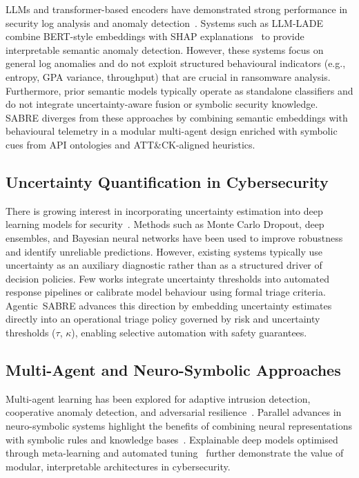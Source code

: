 \documentclass[lettersize,journal]{IEEEtran}
\begin{document}
LLMs and transformer-based encoders have demonstrated strong performance in
security log analysis and anomaly detection~\cite{tian2025llmsurvey, BenchmarkingLLMsPhishing2024}. Systems such as LLM-LADE~\cite{ZhangLZYHY25}
combine BERT-style embeddings with SHAP explanations~\cite{lundberg2017shap} to provide interpretable semantic anomaly detection. However, these systems focus on general log anomalies and do not exploit structured behavioural indicators (e.g., entropy, GPA variance, throughput) that are crucial in ransomware analysis. Furthermore, prior semantic models typically operate as standalone classifiers and do not integrate uncertainty-aware fusion or symbolic security knowledge. SABRE diverges from these approaches by combining semantic embeddings with
behavioural telemetry in a modular multi-agent design enriched with symbolic cues from API ontologies and ATT\&CK-aligned heuristics.

\subsection{Uncertainty Quantification in Cybersecurity}

There is growing interest in incorporating uncertainty estimation into deep
learning models for security~\cite{kabuye2025explainable}. Methods such as Monte Carlo Dropout, deep ensembles, and Bayesian neural networks have been used to improve robustness and identify unreliable predictions. However, existing systems typically use uncertainty as an auxiliary diagnostic rather than as a structured driver of decision policies. Few works integrate uncertainty thresholds into automated response pipelines or calibrate model behaviour using formal triage criteria. Agentic~SABRE advances this direction by embedding uncertainty estimates directly into an operational triage policy governed by risk and uncertainty thresholds (\(\tau\), \(\kappa\)), enabling selective automation with safety guarantees.

\subsection{Multi-Agent and Neuro-Symbolic Approaches}

Multi-agent learning has been explored for adaptive intrusion detection,
cooperative anomaly detection, and adversarial resilience~\cite{AdversarialCooperationLLM2024, MultiAgentAdaptiveDetection2023}. Parallel advances in neuro-symbolic systems highlight the benefits of combining neural representations with symbolic rules and knowledge bases~\cite{YangSBK25}. Explainable deep models optimised through meta-learning and automated tuning~\cite{FaresE25} further demonstrate the value of modular, interpretable architectures in cybersecurity.
\end{document}
